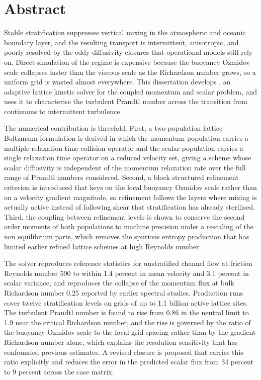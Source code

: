 \chapter*{Abstract}

Stable stratification suppresses vertical mixing in the atmospheric and oceanic
boundary layer, and the resulting transport is intermittent, anisotropic, and
poorly resolved by the eddy diffusivity closures that operational models still
rely on. Direct simulation of the regime is expensive because the buoyancy
Ozmidov scale collapses faster than the viscous scale as the Richardson number
grows, so a uniform grid is wasted almost everywhere. This dissertation
develops \solver, an adaptive lattice kinetic solver for the coupled momentum
and scalar problem, and uses it to characterise the turbulent Prandtl number
across the transition from continuous to intermittent turbulence.

The numerical contribution is threefold. First, a two population lattice
Boltzmann formulation is derived in which the momentum population carries a
multiple relaxation time collision operator and the scalar population carries a
single relaxation time operator on a reduced velocity set, giving a scheme whose
scalar diffusivity is independent of the momentum relaxation rate over the full
range of Prandtl numbers considered. Second, a block structured refinement
criterion is introduced that keys on the local buoyancy Ozmidov scale rather than on
a velocity gradient magnitude, so refinement follows the layers where mixing is
actually active instead of following shear that stratification has already
sterilised. Third, the coupling between refinement levels is shown to conserve
the second order moments of both populations to machine precision under a
rescaling of the non equilibrium parts, which removes the spurious entropy
production that has limited earlier refined lattice schemes at high Reynolds
number.

The solver reproduces reference statistics for unstratified channel flow at
friction Reynolds number 590 to within 1.4 percent in mean velocity and 3.1
percent in scalar variance, and reproduces the collapse of the momentum flux at
bulk Richardson number 0.25 reported by earlier spectral studies. Production
runs cover twelve stratification levels on grids of up to 1.1 billion active
lattice sites. The turbulent Prandtl number is found to rise from 0.86 in the
neutral limit to 1.9 near the critical Richardson number, and the rise is
governed by the ratio of the buoyancy Ozmidov scale to the local grid spacing rather
than by the gradient Richardson number alone, which explains the resolution
sensitivity that has confounded previous estimates. A revised closure is
proposed that carries this ratio explicitly and reduces the error in the
predicted scalar flux from 34 percent to 9 percent across the case matrix.
